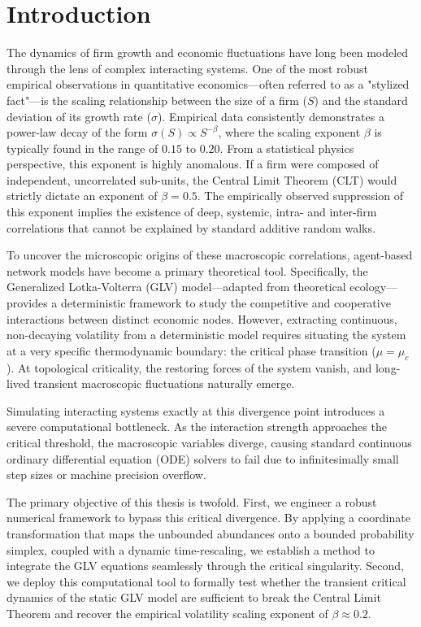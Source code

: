 \chapter{Introduction}

The dynamics of firm growth and economic fluctuations have long been modeled through the lens of complex interacting systems. One of the most robust empirical observations in quantitative economics—often referred to as a "stylized fact"—is the scaling relationship between the size of a firm ($S$) and the standard deviation of its growth rate ($\sigma$). Empirical data consistently demonstrates a power-law decay of the form $\sigma(S) \propto S^{-\beta}$, where the scaling exponent $\beta$ is typically found in the range of $0.15$ to $0.20$. From a statistical physics perspective, this exponent is highly anomalous. If a firm were composed of independent, uncorrelated sub-units, the Central Limit Theorem (CLT) would strictly dictate an exponent of $\beta = 0.5$. The empirically observed suppression of this exponent implies the existence of deep, systemic, intra- and inter-firm correlations that cannot be explained by standard additive random walks.

To uncover the microscopic origins of these macroscopic correlations, agent-based network models have become a primary theoretical tool. Specifically, the Generalized Lotka-Volterra (GLV) model—adapted from theoretical ecology—provides a deterministic framework to study the competitive and cooperative interactions between distinct economic nodes. However, extracting continuous, non-decaying volatility from a deterministic model requires situating the system at a very specific thermodynamic boundary: the critical phase transition ($\mu = \mu_c$). At topological criticality, the restoring forces of the system vanish, and long-lived transient macroscopic fluctuations naturally emerge.

Simulating interacting systems exactly at this divergence point introduces a severe computational bottleneck. As the interaction strength approaches the critical threshold, the macroscopic variables diverge, causing standard continuous ordinary differential equation (ODE) solvers to fail due to infinitesimally small step sizes or machine precision overflow.

The primary objective of this thesis is twofold. First, we engineer a robust numerical framework to bypass this critical divergence. By applying a coordinate transformation that maps the unbounded abundances onto a bounded probability simplex, coupled with a dynamic time-rescaling, we establish a method to integrate the GLV equations seamlessly through the critical singularity. Second, we deploy this computational tool to formally test whether the transient critical dynamics of the static GLV model are sufficient to break the Central Limit Theorem and recover the empirical volatility scaling exponent of $\beta \approx 0.2$.

